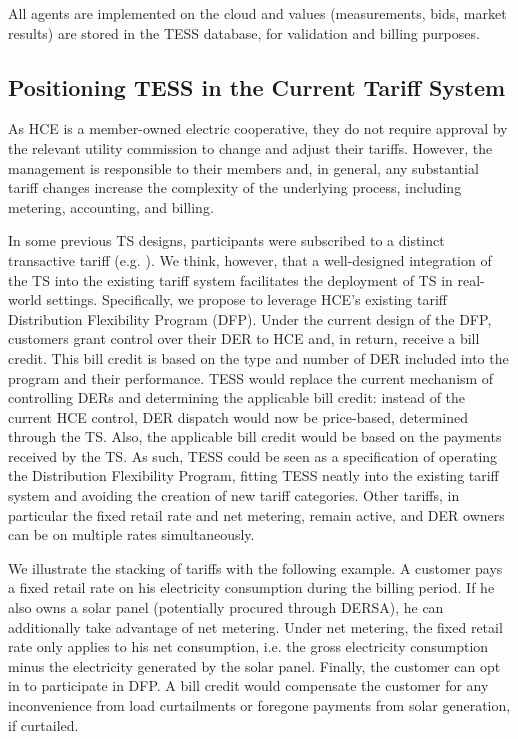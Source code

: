 All agents are implemented on the cloud and values (measurements, bids, market results) are stored in the TESS database, for validation and billing purposes.

\subsection{Positioning TESS in the Current Tariff System}\label{sec:position_tariff_system}

As HCE is a member-owned electric cooperative, they do not require approval by the relevant utility commission to change and adjust their tariffs. However, the management is responsible to their members and, in general, any substantial tariff changes increase the complexity of the underlying process, including metering, accounting, and billing. 

In some previous TS designs, participants were subscribed to a distinct transactive tariff (e.g. \citet{Widergren2014}).
We think, however, that a well-designed integration of the TS into the existing tariff system facilitates the deployment of TS in real-world settings. Specifically, we propose to leverage HCE's existing tariff Distribution Flexibility Program (DFP). Under the current design of the DFP, customers grant control over their DER to HCE and, in return, receive a bill credit. This bill credit is based on the type and number of DER included into the program and their performance. TESS would replace the current mechanism of controlling DERs and determining the applicable bill credit: instead of the current HCE control, DER dispatch would now be price-based, determined through the TS. Also, the applicable bill credit would be based on the payments received by the TS. As such, TESS could be seen as a specification of operating the Distribution Flexibility Program, fitting TESS neatly into the existing tariff system and avoiding the creation of new tariff categories.
Other tariffs, in particular the fixed retail rate and net metering, remain active, and DER owners can be on multiple rates simultaneously. 

We illustrate the stacking of tariffs with the following example. A customer pays a fixed retail rate on his electricity consumption during the billing period. 
If he also owns a solar panel (potentially procured through DERSA), he can additionally take advantage of net metering. Under net metering, the fixed retail rate only applies to his net consumption, i.e. the gross electricity consumption minus the electricity generated by the solar panel. 
Finally, the customer can opt in to participate in DFP. A bill credit would compensate the customer for any inconvenience from load curtailments or foregone payments from solar generation, if curtailed.

